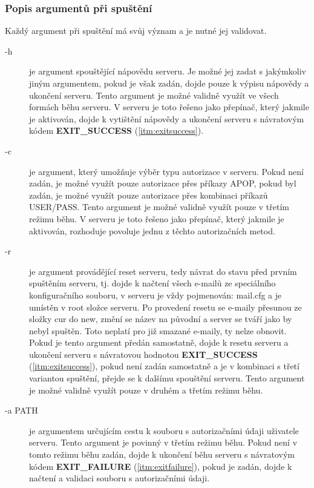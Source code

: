 \documentclass[11pt,a4paper]{report}
\begin{document}
    \subsubsection{Popis argumentů při spuštění}
    Každý argument při spuštění má svůj význam a je nutné jej validovat. \par

    \begin{description}
        \item [-h] \label{itm:help} je argument spouštějící nápovědu serveru. Je možné jej zadat s jakýmkoliv jiným argumentem, pokud je však zadán, dojde pouze k výpisu nápovědy a ukončení serveru. Tento argument je možné validně využít ve všech formách běhu serveru.
        V serveru je toto řešeno jako přepínač, který jakmile je aktivován, dojde k vytištění nápovědy a ukončení serveru s návratovým kódem \textbf{EXIT\_SUCCESS} (\ref{itm:exitsuccess}).
        \item [-c] \label{itm:authorisation}je argument, který umožňuje výběr typu autorizace v serveru. Pokud není zadán, je možné využít pouze autorizace přes příkazy APOP, pokud byl zadán, je možné využít pouze autorizace přes kombinaci příkazů USER/PASS. Tento argument je možné validně využít pouze v třetím režimu běhu.
        V serveru je toto řešeno jako přepínač, který jakmile je aktivován, rozhoduje povoluje jednu z těchto autorizačních metod.
        \item [-r] \label{itm:reset}je argument provádějící reset serveru, tedy návrat do stavu před prvním spuštěním serveru, tj. dojde k načtení všech e-mailů ze speciálního konfiguračního souboru, v serveru je vždy pojmenován: mail.cfg a je umístěn v root složce serveru. Po provedení resetu se e-maily přesunou ze složky cur do new, změní se název na původní a server se tváří jako by nebyl spuštěn. Toto neplatí pro již smazané e-maily, ty nelze obnovit. Pokud je tento argument předán samostatně, dojde k resetu serveru a ukončení serveru s návratovou hodnotou \textbf{EXIT\_SUCCESS} (\ref{itm:exitsuccess}), pokud není zadán samostatně a je v kombinaci s třetí variantou spuštění, přejde se k dalšímu spouštění serveru. Tento argument je možné validně využít pouze v druhém a třetím režimu běhu.
        \item [-a PATH] je argumentem určujícím cestu k souboru s autorizačními údaji uživatele serveru. Tento argument je povinný v třetím režimu běhu. Pokud není v tomto režimu běhu zadán, dojde k ukončení běhu serveru s návratovým kódem \textbf{EXIT\_FAILURE} (\ref{itm:exitfailure}), pokud je zadán, dojde k načtení a validaci souboru s autorizačními údaji.

\end{description}
\end{document}
